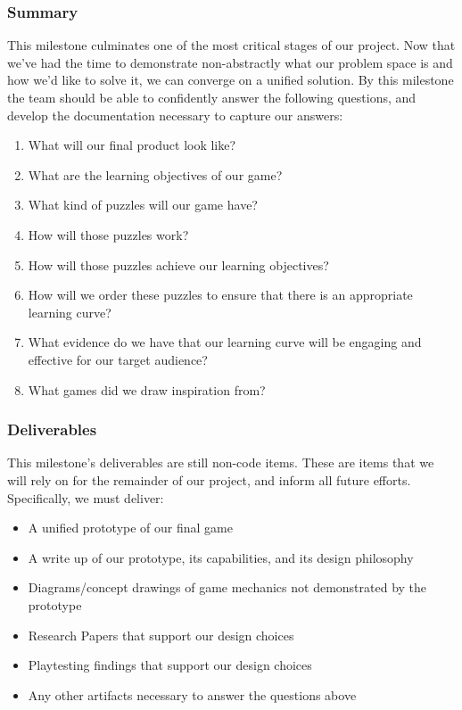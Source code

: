 \subsubsection*{Summary}
This milestone culminates one of the most critical stages of our project. Now
that we’ve had the time to demonstrate non-abstractly what our problem space is
and how we’d like to solve it, we can converge on a unified solution. By this
milestone the team should be able to confidently answer the following questions,
and develop the documentation necessary to capture our answers:
\begin{enumerate}
  \item What will our final product look like?
  \item What are the learning objectives of our game?
  \item What kind of puzzles will our game have?
  \item How will those puzzles work?
  \item How will those puzzles achieve our learning objectives?
  \item How will we order these puzzles to ensure that there is an appropriate
  learning curve?
  \item What evidence do we have that our learning curve will be engaging and
  effective for our target audience?
  \item What games did we draw inspiration from?
\end{enumerate}

\subsubsection*{Deliverables}
This milestone’s deliverables are still non-code items. These are items that we
will rely on for the remainder of our project, and inform all future efforts.
Specifically, we must deliver:
\begin{itemize}
  \item A unified prototype of our final game
  \item A write up of our prototype, its capabilities, and its design philosophy
  \item Diagrams/concept drawings of game mechanics not demonstrated by the prototype
  \item Research Papers that support our design choices
  \item Playtesting findings that support our design choices
  \item Any other artifacts necessary to answer the questions above
\end{itemize}

